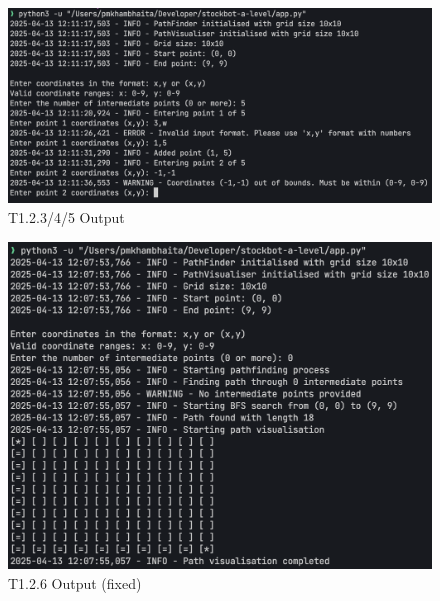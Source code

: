 \begin{figure}[htbp!]
    \centering
    \includegraphics[width=1\linewidth]{Images/t1.2.x.png}
    \caption{T1.2.3/4/5 Output}
    \label{fig:enter-label}
\end{figure}

\begin{figure}[htbp!]
    \centering
    \includegraphics[width=1\linewidth]{Images/t1.2.1.png}
    \caption{T1.2.6 Output (fixed)}
    \label{fig:enter-label}
\end{figure}

\newpage

